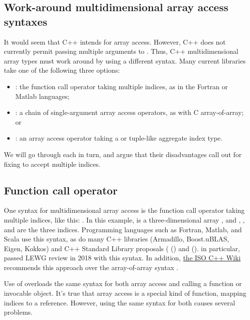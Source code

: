 \documentclass{wg21}
\begin{document}
\subsection{Work-around multidimensional array access syntaxes}

It would seem that C++ intends  for array access.  However, C++ does not currently permit passing multiple arguments to .  Thus, C++ multidimensional array types must work around by using a different syntax.  Many current libraries take one of the following three options:

\begin{itemize}
\item {}: the function call operator taking multiple indices, as in the Fortran or Matlab languages;
\item {}: a chain of single-argument array access operators, as with C array-of-array; or
\item {}: an array access operator taking a  or tuple-like aggregate index type.
\end{itemize}

We will go through each in turn, and argue that their disadvantages call out for fixing  to accept multiple indices.

\subsection{Function call operator}

One syntax for multidimensional array access is the function call operator taking multiple indices, like this: .  In this example,  is a three-dimensional array , and , , and  are the three indices.  Programming languages such as Fortran, Matlab, and Scala use this syntax, as do many C++ libraries (Armadillo, Boost.uBLAS, Eigen, Kokkos) and C++ Standard Library proposals ( () and  ().   in particular, passed LEWG review in 2018 with this syntax.  In addition, \href{https://isocpp.org/wiki/faq/operator-overloading#matrix-subscript-op}{the ISO C++ Wiki} recommends this approach over the array-of-array syntax .

Use of  overloads the same syntax for both array access and calling a function or invocable object.  It's true that array access is a special kind of function, mapping indices to a reference.  However, using the same syntax for both causes several problems.
\end{document}
